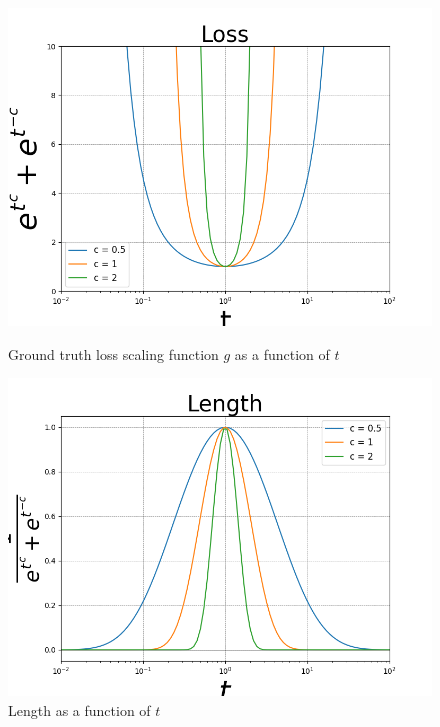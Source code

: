 \begin{figure}[htbp]
    \centering
       \begin{minipage}{0.32\textwidth}
        \centering
        \includegraphics[width=\textwidth]{../figures/Figure_1b.png}
        \caption{Ground truth loss scaling function $g$ as a function of $t$}
        \label{fig:gt_loss}
    \end{minipage}
    \begin{minipage}{0.32\textwidth}
        \centering
        \includegraphics[width=\textwidth]{../figures/Figure_1a.png}
        \caption{Length as a function of $t$}
        \label{fig:length}
    \end{minipage}

\end{figure}
